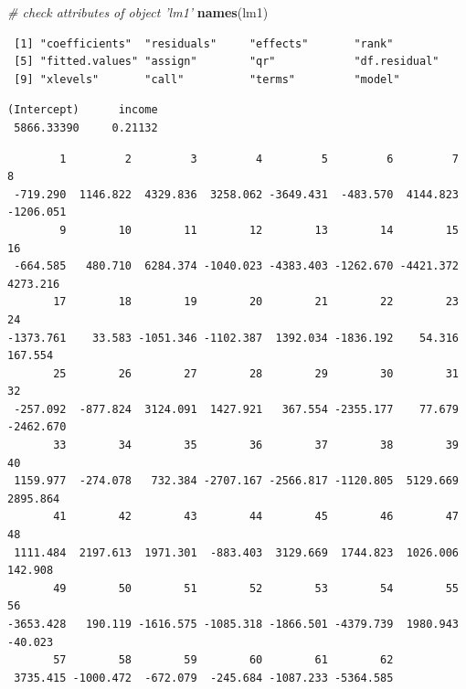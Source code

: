 \documentclass[
]{book}
\newenvironment{Shaded}{\begin{snugshade}}{\end{snugshade}}
\newcommand{\CommentTok}[1]{\textcolor[rgb]{0.56,0.35,0.01}{\textit{#1}}}
\newcommand{\KeywordTok}[1]{\textcolor[rgb]{0.13,0.29,0.53}{\textbf{#1}}}
\newcommand{\NormalTok}[1]{#1}
\newcommand{\OperatorTok}[1]{\textcolor[rgb]{0.81,0.36,0.00}{\textbf{#1}}}
\begin{document}
\begin{Shaded}
\begin{Highlighting}[]
\CommentTok{# check attributes of object 'lm1'}
\KeywordTok{names}\NormalTok{(lm1)}
\end{Highlighting}
\end{Shaded}

\begin{verbatim}
 [1] "coefficients"  "residuals"     "effects"       "rank"         
 [5] "fitted.values" "assign"        "qr"            "df.residual"  
 [9] "xlevels"       "call"          "terms"         "model"        
\end{verbatim}

\begin{Shaded}
\end{Shaded}

\begin{verbatim}
(Intercept)      income 
 5866.33390     0.21132 
\end{verbatim}

\begin{Shaded}
\end{Shaded}

\begin{verbatim}
        1         2         3         4         5         6         7         8 
 -719.290  1146.822  4329.836  3258.062 -3649.431  -483.570  4144.823 -1206.051 
        9        10        11        12        13        14        15        16 
 -664.585   480.710  6284.374 -1040.023 -4383.403 -1262.670 -4421.372  4273.216 
       17        18        19        20        21        22        23        24 
-1373.761    33.583 -1051.346 -1102.387  1392.034 -1836.192    54.316   167.554 
       25        26        27        28        29        30        31        32 
 -257.092  -877.824  3124.091  1427.921   367.554 -2355.177    77.679 -2462.670 
       33        34        35        36        37        38        39        40 
 1159.977  -274.078   732.384 -2707.167 -2566.817 -1120.805  5129.669  2895.864 
       41        42        43        44        45        46        47        48 
 1111.484  2197.613  1971.301  -883.403  3129.669  1744.823  1026.006   142.908 
       49        50        51        52        53        54        55        56 
-3653.428   190.119 -1616.575 -1085.318 -1866.501 -4379.739  1980.943   -40.023 
       57        58        59        60        61        62 
 3735.415 -1000.472  -672.079  -245.684 -1087.233 -5364.585 
\end{verbatim}
\end{document}
